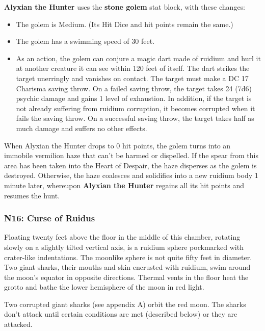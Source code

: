 \documentclass[10pt,a4paper,twoside,fancy,bg=print,twocolumn,openany,nodeprecatedcode]{dndbook}
\begin{document}
\textbf{Alyxian the Hunter} uses the \textbf{stone golem} stat block, with these changes:


\begin{itemize}
\item The golem is Medium. (Its Hit Dice and hit points remain the same.)
\item The golem has a swimming speed of 30 feet.
\item As an action, the golem can conjure a magic dart made of ruidium and hurl it at another creature it can see within 120 feet of itself. The dart strikes the target unerringly and vanishes on contact. The target must make a DC 17 Charisma saving throw. On a failed saving throw, the target takes 24 (7d6) psychic damage and gains 1 level of exhaustion. In addition, if the target is not already suffering from ruidium corruption, it becomes corrupted when it fails the saving throw. On a successful saving throw, the target takes half as much damage and suffers no other effects.
\end{itemize}

When Alyxian the Hunter drops to 0 hit points, the golem turns into an immobile vermilion haze that can't be harmed or dispelled. If the spear from this area has been taken into the Heart of Despair, the haze disperses as the golem is destroyed. Otherwise, the haze coalesces and solidifies into a new ruidium body 1 minute later, whereupon \textbf{Alyxian the Hunter} regains all its hit points and resumes the hunt.

\subsubsection{N16: Curse of Ruidus}
\begin{DndReadAloud}{}
Floating twenty feet above the floor in the middle of this chamber, rotating slowly on a slightly tilted vertical axis, is a ruidium sphere pockmarked with crater-like indentations. The moonlike sphere is not quite fifty feet in diameter. Two giant sharks, their mouths and skin encrusted with ruidium, swim around the moon's equator in opposite directions. Thermal vents in the floor heat the grotto and bathe the lower hemisphere of the moon in red light.

\end{DndReadAloud}

Two corrupted giant sharks (see appendix A) orbit the red moon. The sharks don't attack until certain conditions are met (described below) or they are attacked.
\end{document}
